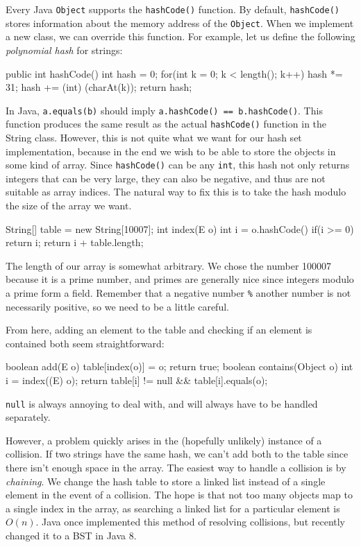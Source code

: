 Every Java \texttt{Object} supports the \texttt{hashCode()} function. By default, \texttt{hashCode()} stores information about the memory address of the \texttt{Object}. When we implement a new class, we can override this function. For example, let us define the following \textit{polynomial hash} for strings:

\begin{mylstlisting}
public int hashCode() {
	int hash = 0;
    for(int k = 0; k < length(); k++) {
		hash *= 31;
        hash += (int) (charAt(k));
    }
    return hash;
}
\end{mylstlisting}

In Java, \texttt{a.equals(b)} should imply \texttt{a.hashCode() == b.hashCode()}. This function produces the same result as the actual \texttt{hashCode()} function in the String class. However, this is not quite what we want for our hash set implementation, because in the end we wish to be able to store the objects in some kind of array. Since \texttt{hashCode()} can be any \texttt{int}, this hash not only returns integers that can be very large, they can also be negative, and thus are not suitable as array indices. The natural way to fix this is to take the hash modulo the size of the array we want.

\begin{mylstlisting}
String[] table = new String[10007];
int index(E o) {
	int i = o.hashCode() %
    if(i >= 0)
    	return i;
	return i + table.length;
}
\end{mylstlisting}

The length of our array is somewhat arbitrary. We chose the number 100007 because it is a prime number, and primes are generally nice since integers modulo a prime form a field. Remember that a negative number \texttt{\%} another number is not necessarily positive, so we need to be a little careful.

From here, adding an element to the table and checking if an element is contained both seem straightforward:

\begin{mylstlisting}
boolean add(E o) {
	table[index(o)] = o;
    return true;
}
boolean contains(Object o) {
    int i = index((E) o);
	return table[i] != null && table[i].equals(o);
}
\end{mylstlisting}

\texttt{null} is always annoying to deal with, and will always have to be handled separately.

However, a problem quickly arises in the (hopefully unlikely) instance of a collision. If two strings have the same hash, we can't add both to the table since there isn't enough space in the array. The easiest way to handle a collision is by \textit{chaining}. We change the hash table to store a linked list instead of a single element in the event of a collision. The hope is that not too many objects map to a single index in the array, as searching a linked list for a particular element is $O(n)$. Java once implemented this method of resolving collisions, but recently changed it to a BST in Java 8.

